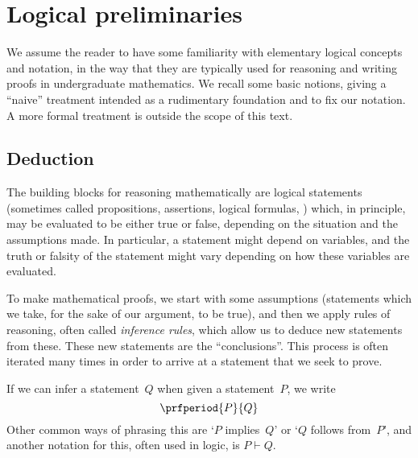 
\section{Logical preliminaries}
\label{sec:logical-prelim}


We assume the reader to have some familiarity with elementary logical concepts and notation, in the way that they are typically used for reasoning and writing proofs in undergraduate mathematics.
We recall some basic notions, giving a ``naive'' treatment intended as a rudimentary foundation and to fix our notation.
A more formal treatment is outside the scope of this text.


\subsection{Deduction}

The building blocks for reasoning mathematically are logical statements (sometimes called propositions, assertions, logical formulas, \etc) which, in principle, may be evaluated to be either true or false, depending on the situation and the assumptions made.
In particular, a statement might depend on variables, and the truth or falsity of the statement might vary depending on how these variables are evaluated.

To make mathematical proofs, we start with some assumptions (statements which we take, for the sake of our argument, to be true), and then we apply rules of reasoning, often called \emph{inference rules}, which allow us to deduce new statements from these.
These new statements are the ``conclusions''.
This process is often iterated many times in order to arrive at a statement that we seek to prove.

If we can infer a statement~$Q$ when given a statement~$P$, we write
\begin{equation}
    \prfperiod
    {P}{Q}
\end{equation}
Other common ways of phrasing this are `$P$ implies~$Q$' or `$Q$ follows from~$P$', and another notation for this, often used in logic, is $P \vdash Q$.

